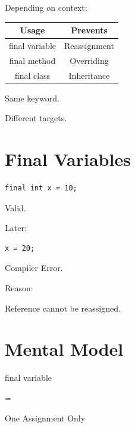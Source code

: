 \documentclass[11pt,a4paper]{book}
\begin{document}
Depending on context:


\begin{tabular}{|c|c|}
\hline
Usage & Prevents \\
\hline
final variable & Reassignment \\
\hline
final method & Overriding \\
\hline
final class & Inheritance \\
\hline
\end{tabular}


Same keyword.

Different targets.


\section{Final Variables}

\begin{verbatim}
final int x = 10;
\end{verbatim}


Valid.


Later:

\begin{verbatim}
x = 20;
\end{verbatim}


Compiler Error.


Reason:

Reference cannot be reassigned.


\section{Mental Model}

\begin{mentalmodel}

final variable

=

One Assignment Only

\end{mentalmodel}
\end{document}
